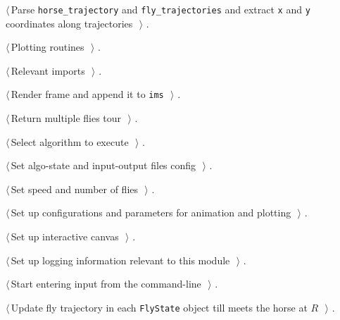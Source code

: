 \documentclass[11.5pt]{report}
\begin{document}
{\begin{list}{}{\setlength{\itemsep}{-\parsep}\setlength{\itemindent}{-\leftmargin}}
\item $\langle\,$Parse \verb|horse_trajectory| and \verb|fly_trajectories| and extract \verb|x| and \verb|y| coordinates along trajectories\nobreak\ {\footnotesize {}}$\,\rangle$ {\footnotesize {\NWtxtRefIn} .}
\item $\langle\,$Plotting routines\nobreak\ {\footnotesize {}}$\,\rangle$ {\footnotesize {\NWtxtRefIn} .}
\item $\langle\,$Relevant imports\nobreak\ {\footnotesize {}}$\,\rangle$ {\footnotesize {\NWtxtRefIn} .}
\item $\langle\,$Render frame and append it to \verb|ims|\nobreak\ {\footnotesize {}}$\,\rangle$ {\footnotesize {\NWtxtRefIn} .}
\item $\langle\,$Return multiple flies tour\nobreak\ {\footnotesize {}}$\,\rangle$ {\footnotesize {\NWtxtRefIn} .}
\item $\langle\,$Select algorithm to execute\nobreak\ {\footnotesize {}}$\,\rangle$ {\footnotesize {\NWtxtRefIn} .}
\item $\langle\,$Set algo-state and input-output files config\nobreak\ {\footnotesize {}}$\,\rangle$ {\footnotesize {\NWtxtRefIn} .}
\item $\langle\,$Set speed and number of flies\nobreak\ {\footnotesize {}}$\,\rangle$ {\footnotesize {\NWtxtRefIn} .}
\item $\langle\,$Set up configurations and parameters for animation and plotting\nobreak\ {\footnotesize {}}$\,\rangle$ {\footnotesize {\NWtxtRefIn} .}
\item $\langle\,$Set up interactive canvas\nobreak\ {\footnotesize {}}$\,\rangle$ {\footnotesize {\NWtxtRefIn} .}
\item $\langle\,$Set up logging information relevant to this module\nobreak\ {\footnotesize {}}$\,\rangle$ {\footnotesize {\NWtxtRefIn} .}
\item $\langle\,$Start entering input from the command-line\nobreak\ {\footnotesize {}}$\,\rangle$ {\footnotesize {\NWtxtRefIn} .}
\item $\langle\,$Update fly trajectory in each \verb|FlyState| object till  meets the horse at $R$\nobreak\ {\footnotesize {}}$\,\rangle$ {\footnotesize {\NWtxtRefIn} .}

\end{list}}
\end{document}

